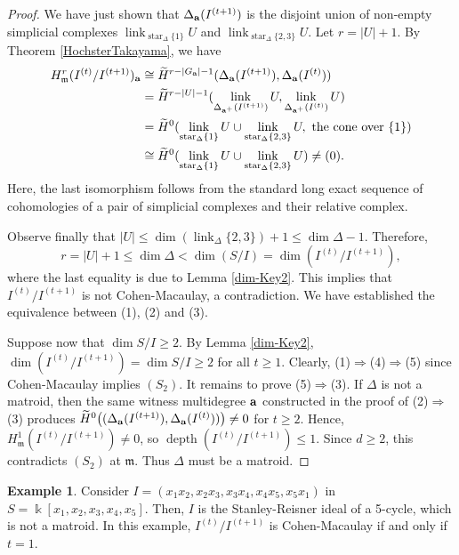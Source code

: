 \documentclass[12pt]{amsart}
\numberwithin{equation}{section}
\theoremstyle{definition}
\theoremstyle{definition}
\newtheorem{example}[theorem]{Example}
\DeclareMathOperator{\depth}{depth}
\DeclareMathOperator{\link}{link}
\DeclareMathOperator{\starop}{star}
\def\kk{{\Bbbk}}
\def\mm{{\mathfrak m}}
\def\a{{\bold a}}
\begin{document}
\begin{proof}
We have just shown that $\Delta_{\a}(I^{(t+1)})$ is the disjoint union of non-empty simplicial complexes $\link_{\starop_{\Delta} \{1\}} U$ and $\link_{\starop_{\Delta} \{2,3\}}U$. Let $r= |U| + 1$.
	By Theorem \ref{HochsterTakayama}, we have 
	\begin{align*}
		H_{\mm}^{r}( I^{(t)}/I^{(t+1)})_{\a}&\cong \widetilde{H}^{r-|G_\a|-1}(\Delta_\a(I^{(t+1)}),\Delta_\a(I^{(t)}))\\
		&=\widetilde{H}^{r-|U|-1}(\link_{\Delta_{\a^+}(I^{(t+1)})}U, \link_{\Delta_{\a^+}(I^{(t)})}U)\\
		&=\widetilde{H}^{0}(\link_{\starop_{\Delta} \{1\}} U  \cup \link_{\starop_{\Delta} \{2,3\}}U, \text{ the cone over } \{1\})\\
		&\cong \widetilde{H}^{0}(\link_{\starop_{\Delta} \{1\}} U  \cup \link_{\starop_{\Delta} \{2,3\}}U) \ne (0).
	\end{align*}
	Here, the last isomorphism follows from the standard long exact sequence of cohomologies of a pair of simplicial complexes and their relative complex.

Observe finally that $|U| \leq \dim(\link_{\Delta}\{2,3\})+1 \leq \dim \Delta-1$. Therefore, 
	$$r = |U| + 1 \leq \dim \Delta < \dim (S/I)=\dim(I^{(t)}/I^{(t+1)}),$$ 
	where the last equality is due to Lemma \ref{dim-Key2}. This implies that $I^{(t)}/I^{(t+1)}$ is not Cohen-Macaulay, a contradiction. We have established the equivalence between (1), (2) and (3).

Suppose now that $\dim S/I \ge 2$. By Lemma \ref{dim-Key2}, $\dim(I^{(t)}/I^{(t+1)}) = \dim S/I \ge 2$ for all $t \ge 1$. Clearly, (1)$\Longrightarrow$(4)$\Longrightarrow$(5) since Cohen-Macaulay implies $(S_2)$.
	It remains to prove (5)$\Longrightarrow$(3).
	If $\Delta$ is not a matroid, then the same witness multidegree $\a$ constructed in the proof of (2)$\Longrightarrow$(3)
	produces $\widetilde H^0\bigl((\Delta_{\a}(I^{(t+1)}),\Delta_{\a}(I^{(t)}))\bigr) \neq 0$ for $t \ge 2$.
	Hence, $H^1_{\mm}(I^{(t)}/I^{(t+1)}) \neq 0$, so $\depth(I^{(t)}/I^{(t+1)}) \le 1$. 
	Since $d\ge 2$, this contradicts $(S_2)$ at $\mm$.
	Thus $\Delta$ must be a matroid.
\end{proof}

\begin{example}
	Consider $I=(x_1x_2,x_2x_3,x_3x_4,x_4x_5,x_5x_1)$ in $S=\kk[x_1,x_2,x_3,x_4,x_5]$. Then, $I$ is the Stanley-Reisner ideal of a 5-cycle, which is not a matroid. In this example, $I^{(t)}/I^{(t+1)}$ is Cohen-Macaulay if and only if $t=1$.
\end{example}
\end{document}
